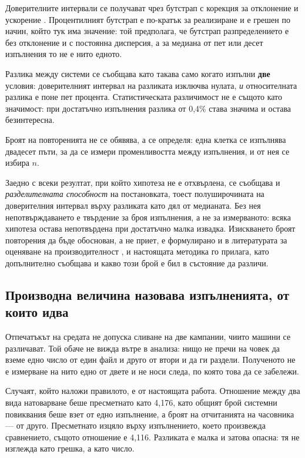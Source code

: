 Доверителните интервали се получават чрез бутстрап с корекция за отклонение и ускорение
\cite{efron1987better}. Процентилният бутстрап е по-кратък за реализиране и е грешен по
начин, който тук има значение: той предполага, че бутстрап разпределението е без отклонение
и с постоянна дисперсия, а за медиана от пет или десет изпълнения то не е нито едното.

Разлика между системи се съобщава като такава само когато изпълни \textbf{две} условия:
доверителният интервал на разликата изключва нулата, \emph{и} относителната разлика е поне
пет процента. Статистическата различимост не е същото като значимост: при достатъчно
изпълнения разлика от 0,4\% става значима и остава безинтересна.

Броят на повторенията не се обявява, а се определя: една клетка се изпълнява двадесет пъти,
за да се измери променливостта между изпълнения, и от нея се избира $n$.

Заедно с всеки резултат, при който хипотеза не е отхвърлена, се съобщава и \emph{разделителната
способност} на постановката, тоест полуширочината на доверителния интервал върху разликата
като дял от медианата. Без нея непотвърждаването е твърдение за броя изпълнения, а не за
измерваното: всяка хипотеза остава непотвърдена при достатъчно малка извадка. Изискването
броят повторения да бъде обоснован, а не приет, е формулирано и в литературата за оценяване
на производителност \cite{georges2007statistically}, и настоящата методика го прилага, като
допълнително съобщава и какво този брой е бил в състояние да различи.

\subsection{Производна величина назовава изпълненията, от които идва}

Отпечатъкът на средата не допуска сливане на две кампании, чиито машини се различават. Той
обаче не вижда вътре в анализа: нищо не пречи на човек да вземе едно число от един файл и
друго от втори и да ги раздели. Полученото не е измерване на нито едно от двете и не носи
следа, по която това да се забележи.

Случаят, който наложи правилото, е от настоящата работа. Отношение между два вида натоварване
беше пресметнато като 4,176, като общият брой системни повиквания беше взет от едно
изпълнение, а броят на отчитанията на часовника --- от друго. Пресметнато изцяло върху
изпълнението, което произвежда сравнението, същото отношение е 4,116. Разликата е малка и
затова опасна: тя не изглежда като грешка, а като число.

